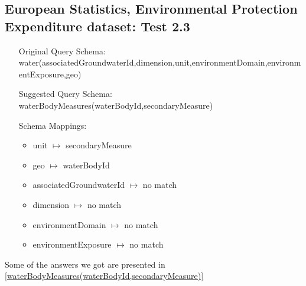 \documentclass[a4paper,10pt]{article}
\begin{document}
\subsection{European Statistics, Environmental Protection Expenditure dataset: Test 2.3}
\label{Test 2.3}


\begin{itemize}
\item[Original Query Schema:]water(associatedGroundwaterId,dimension,unit,environmentDomain,environmentExposure,geo)
\item[Suggested Query Schema: ]
waterBodyMeasures(waterBodyId,secondaryMeasure)
\item[Schema Mappings:] 
		\begin{itemize}
\item unit $\mapsto$ secondaryMeasure
\item geo $\mapsto$ waterBodyId
\item associatedGroundwaterId $\mapsto$ no match
\item dimension $\mapsto$ no match
\item environmentDomain $\mapsto$ no match
\item environmentExposure $\mapsto$ no match
		\end{itemize}
\end{itemize}


Some of the answers we got are presented in  \ref{waterBodyMeasures(waterBodyId,secondaryMeasure)}
\end{document}
